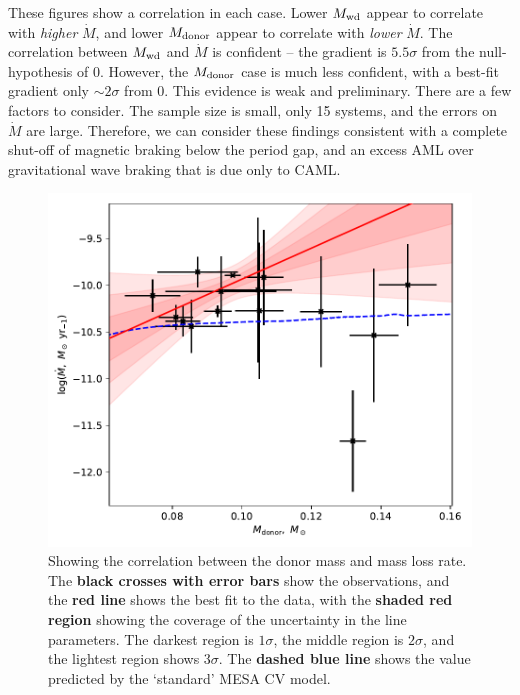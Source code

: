 These figures show a correlation in each case. Lower $M_{\rm wd}$ appear to correlate with \textit{higher} $\dot M$, and lower $M_{\rm donor}$ appear to correlate with \textit{lower} $\dot M$.
The correlation between $M_{\rm wd}$ and $\dot M$ is confident -- the gradient is $5.5\sigma$ from the null-hypothesis of 0.
However, the $M_{\rm donor}$ case is much less confident, with a best-fit gradient only $\sim2\sigma$ from 0. This evidence is weak and preliminary.
There are a few factors to consider. The sample size is small, only 15 systems, and the errors on $\dot M$ are large.
Therefore, we can consider these findings consistent with a complete shut-off of magnetic braking below the period gap, and an excess AML over gravitational wave braking that is due only to CAML.
\begin{figure}
    \centering
    \includegraphics[width=\textwidth]{figures/results/Mdot/Mr_Mdot.pdf}
    \caption{Showing the correlation between the donor mass and mass loss rate. The {\bf black crosses with error bars} show the observations, and the {\bf red line} shows the best fit to the data, with the {\bf shaded red region} showing the coverage of the uncertainty in the line parameters. The darkest region is $1\sigma$, the middle region is $2\sigma$, and the lightest region shows $3\sigma$. The {\bf dashed blue line} shows the value predicted by the `standard' MESA CV model.}
    \label{fig:discussion:donor mass vs Mdot fit}
\end{figure}
